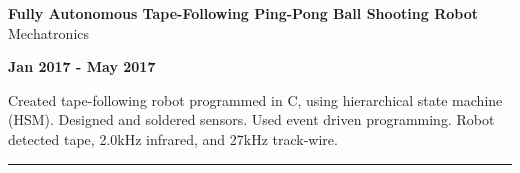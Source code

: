 \documentclass[paper=a4,fontsize=11pt]{article} %
\def \sectionSpace      {0.3cm}    %
\def \subSectionSpace   {0.25cm}     %
\def \leftColSpace      {0.1}       %
\def \middleColSpace    {0.73}       %
\def \bigMiddleColSpace {0.8}       %
\def \rightColSpace     {0.25}      %
\def \lineWidth         {20.25cm}   %
\def \lineThickness     {1pt}     %
\begin{document}
    \vspace{\subSectionSpace}  
    \noindent
    \begin{minipage}[t]{\leftColSpace\linewidth}
        \noindent \hfill
    \end{minipage}
    \begin{minipage}[t]{\middleColSpace\linewidth}
        \noindent \textbf{Fully Autonomous Tape-Following Ping-Pong Ball Shooting Robot} \quad Mechatronics
    \end{minipage}
    \begin{minipage}[t]{\rightColSpace\linewidth}
        \noindent \textbf{Jan 2017 - May 2017}
    \end{minipage}

    \noindent
    \begin{minipage}[t]{\leftColSpace\linewidth}
        \hfill
    \end{minipage}
    \begin{minipage}[t]{\bigMiddleColSpace\linewidth}
        Created tape-following robot programmed in C, using hierarchical state machine (HSM). Designed and soldered sensors. Used event driven programming. Robot detected tape, 2.0kHz infrared, and 27kHz track-wire.
    \end{minipage}

    \vspace{\sectionSpace}
    \noindent\rule{\lineWidth}{\lineThickness}
\end{document}
